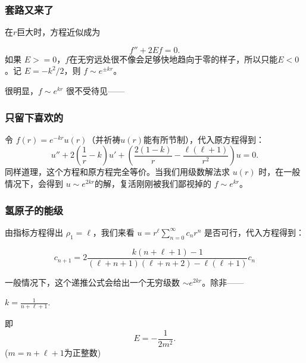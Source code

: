 \documentclass[CJK]{beamer}
\begin{document}
\begin{frame}
  \frametitle{套路又来了}
  在$r$巨大时，方程近似成为

  $$ f'' + 2Ef = 0.$$
  如果 $E>=0$，$f$在无穷远处很不像会足够快地趋向于零的样子，所以只能$E<0$。记 $E=-k^2/2$，则 $f\sim e^{\pm kr}$。

  \skipline

  很明显，$f\sim e^{kr}$ 很不受待见——
\end{frame}

\begin{frame}
  \frametitle{只留下喜欢的}
  令 $f(r)  = e^{-kr} u(r) $（并祈祷$u(r)$能有所节制），代入原方程得到：
  $$ u'' +2\left(\frac{1}{r}-k\right)u' +\left(\frac{2(1-k)}{r} - \frac{\ell(\ell+1)}{r^2}\right)u = 0.$$
  同样道理，这个方程和原方程完全等价。当我们用级数解法求 $u(r)$ 时，在一般情况下，会得到 $u\sim e^{2kr}$的解，复活刚刚被我们鄙视掉的 $f\sim e^{kr}$。
\end{frame}

\begin{frame}
  \frametitle{氢原子的能级}
  由指标方程得出 $\rho_1=\ell$，我们来看 $u = r^\ell\sum_{n=0}^\infty c_nr^n$ 是否可行，代入方程得到：

  $$ c_{n+1}=2\frac{k(n+\ell+1)-1}{(\ell+n+1)(\ell+n+2)-\ell(\ell+1)}c_n $$

  一般情况下，这个递推公式会给出一个无穷级数 $\sim e^{2kr}$。除非——

  $k=\frac{1}{n+\ell+1}$.

  即 $$ E = -\frac{1}{2m^2}.$$
  ($m=n+\ell+1$为正整数) 
  
\end{frame}



\ech
\end{document}
